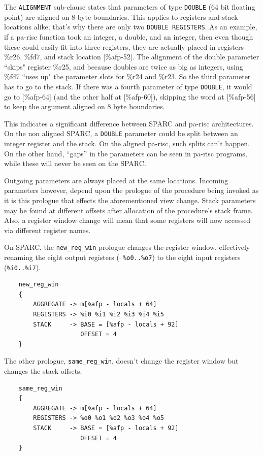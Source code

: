 The {\tt ALIGNMENT} sub-clause states that parameters of type {\tt DOUBLE}
(64 bit floating point) are aligned on 8 byte boundaries. This applies to
registers and stack locations alike; that's why there are only two
{\tt DOUBLE REGISTERS}. As an example, if a pa-risc function took an
integer, a double, and an integer, then even though these could easily
fit into three registers, they are actually placed in registers \%r26,
\%fd7, and stack location [\%afp-52]. The alignment of the double parameter
``skips" register \%r25, and because doubles are twice as big as integers,
using \%fd7 ``uses up" the parameter slots for \%r24 and \%r23. So the third
parameter has to go to the stack. If there was a fourth parameter of type
{\tt DOUBLE}, it would go to [\%afp-64] (and the other half at [\%afp-60]),
skipping the word at [\%afp-56] to keep the argument aligned on 8 byte
boundaries.

This indicates a significant difference between SPARC and pa-risc architectures.
On the non aligned SPARC, a {\tt DOUBLE} parameter could be split between
an integer register and the stack. On the aligned pa-risc, such splits
can't happen. On the other hand, ``gaps'' in the parameters can be seen
in pa-risc programs, while these will never be seen on the SPARC.

Outgoing parameters are always placed at the same locations. Incoming
parameters however, depend upon the prologue of the procedure being
invoked as it is this prologue that effects the aforementioned
view change. Stack parameters may be found at different offsets
after allocation of the procedure's stack frame. Also, a register
window change will mean that some registers will now accessed via
different register names.

On SPARC, the {\tt new\_reg\_win} prologue changes the register
window, effectively renaming the eight output registers ({\tt
\%o0..\%o7}) to the eight input registers ({\tt \%i0..\%i7}).

\begin{verbatim}
    new_reg_win
    {
        AGGREGATE -> m[%afp - locals + 64]
        REGISTERS -> %i0 %i1 %i2 %i3 %i4 %i5
        STACK     -> BASE = [%afp - locals + 92] 
                     OFFSET = 4
    }
\end{verbatim}

The other prologue, {\tt same\_reg\_win}, doesn't change the register
window but changes the stack offsets.

\begin{verbatim}
	same_reg_win
    {
        AGGREGATE -> m[%afp - locals + 64]
        REGISTERS -> %o0 %o1 %o2 %o3 %o4 %o5
        STACK     -> BASE = [%afp - locals + 92] 
                     OFFSET = 4
    }
\end{verbatim}

